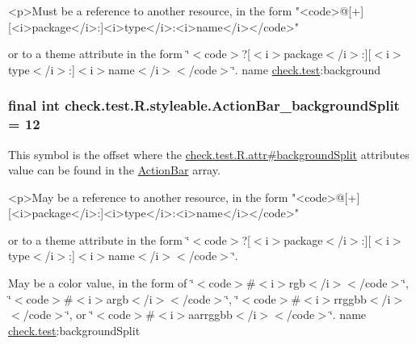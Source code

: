 \begin{DoxyVerb}      <p>Must be a reference to another resource, in the form "<code>@[+][<i>package</i>:]<i>type</i>:<i>name</i></code>"
\end{DoxyVerb}
 or to a theme attribute in the form \char`\"{}$<$code$>$?\mbox{[}$<$i$>$package$<$/i$>$\+:\mbox{]}\mbox{[}$<$i$>$type$<$/i$>$\+:\mbox{]}$<$i$>$name$<$/i$>$$<$/code$>$\char`\"{}.  name \hyperlink{namespacecheck_1_1test}{check.\+test}\+:background \hypertarget{classcheck_1_1test_1_1_r_1_1styleable_ab05dbfd1387a947374d7ec306fa7b7a1}{}
\subsubsection[{Action\+Bar\+\_\+background\+Split}]{\setlength{\rightskip}{0pt plus 5cm}final int check.\+test.\+R.\+styleable.\+Action\+Bar\+\_\+background\+Split = 12\hspace{0.3cm}{\ttfamily [static]}}\label{classcheck_1_1test_1_1_r_1_1styleable_ab05dbfd1387a947374d7ec306fa7b7a1}
This symbol is the offset where the \hyperlink{classcheck_1_1test_1_1_r_1_1attr_ab1f7b7ff195fede33bbdf5e4010cb312}{check.\+test.\+R.\+attr\#background\+Split} attribute\textquotesingle{}s value can be found in the \hyperlink{classcheck_1_1test_1_1_r_1_1styleable_ad0a4d403cb244ea4d22c6f6ebf2c2cdf}{Action\+Bar} array.

\begin{DoxyVerb}      <p>May be a reference to another resource, in the form "<code>@[+][<i>package</i>:]<i>type</i>:<i>name</i></code>"
\end{DoxyVerb}
 or to a theme attribute in the form \char`\"{}$<$code$>$?\mbox{[}$<$i$>$package$<$/i$>$\+:\mbox{]}\mbox{[}$<$i$>$type$<$/i$>$\+:\mbox{]}$<$i$>$name$<$/i$>$$<$/code$>$\char`\"{}. 

May be a color value, in the form of \char`\"{}$<$code$>$\#$<$i$>$rgb$<$/i$>$$<$/code$>$\char`\"{}, \char`\"{}$<$code$>$\#$<$i$>$argb$<$/i$>$$<$/code$>$\char`\"{}, \char`\"{}$<$code$>$\#$<$i$>$rrggbb$<$/i$>$$<$/code$>$\char`\"{}, or \char`\"{}$<$code$>$\#$<$i$>$aarrggbb$<$/i$>$$<$/code$>$\char`\"{}.  name \hyperlink{namespacecheck_1_1test}{check.\+test}\+:background\+Split \hypertarget{classcheck_1_1test_1_1_r_1_1styleable_a6cf5689cb912280e627b781eaa714029}{}
